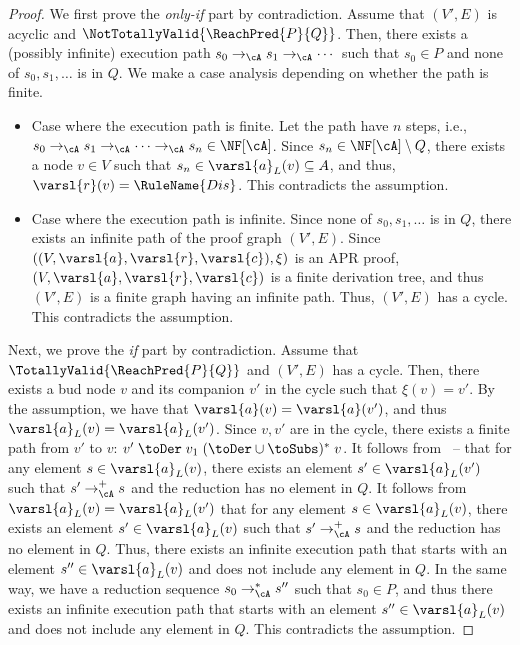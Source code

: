 \ThmTotalValidityProof*
\begin{proof}
	We first prove the \textit{only-if} part by contradiction.
	Assume that $(V',E)$ is acyclic and $\NotTotallyValid{\ReachPred{P}{Q}}$.
	Then, there exists a (possibly infinite) execution path $s_0 \to_\cA s_1 \to_\cA \cdots$ such that $s_0 \in P$ and none of $s_0,s_1,\ldots$ is in $Q$.
	We make a case analysis depending on whether the path is finite.
	\begin{itemize}
		\item Case where the execution path is finite.
		      Let the path have $n$ steps, i.e.,
		      $s_0 \to_\cA s_1 \to_\cA \cdots \to_\cA s_n \in \NF[\cA]$.
		      Since $s_n \in \NF[\cA] \setminus Q$,
		      there exists a node $v \in V$ such that
		      $s_n \in \varsl{a}_L(v) \subseteq A$, and thus, $\varsl{r}(v) = \RuleName{Dis}$.
		      This contradicts the assumption.


		\item Case where the execution path is infinite.
		      Since none of $s_0,s_1,\ldots$ is in $Q$,
		      there exists an infinite path of the proof graph $(V',E)$.
		      Since $((V,\varsl{a},\varsl{r},\varsl{c}),\xi)$ is an APR proof, $(V,\varsl{a},\varsl{r},\varsl{c})$ is a finite derivation tree, and thus $(V',E)$ is a finite graph having an infinite path.
		      Thus, $(V',E)$ has a cycle.
		      This contradicts the assumption.
	\end{itemize}

	Next, we prove the \textit{if} part by contradiction.
	Assume that
	$\TotallyValid{\ReachPred{P}{Q}}$
	and
	$(V',E)$ has a cycle.
	Then, there exists a bud node $v$ and its companion $v'$ in the cycle such that $\xi(v) = v'$.
	By the assumption, we have that $\varsl{a}(v)=\varsl{a}(v')$, and thus $\varsl{a}_L(v) = \varsl{a}_L(v')$. Since $v,v'$ are in the cycle, there exists a finite path from $v'$ to $v$:
	$v' \mathrel{\toDer} v_1 \mathrel{({\toDer} \cup {\toSubs})^*} v$.
	It follows from ~-- that
	for any element $s \in \varsl{a}_L(v)$,
	there exists an element $s' \in \varsl{a}_L(v')$
	such that $s' \to_\cA^+ s$ and the reduction has no element in $Q$.
	It follows from $\varsl{a}_L(v) = \varsl{a}_L(v')$ that
	for any element $s \in \varsl{a}_L(v)$,
	there exists an element $s' \in \varsl{a}_L(v)$
	such that $s' \to_\cA^+ s$ and the reduction has no element in $Q$.
	Thus, there exists an infinite execution path that starts with an element $s'' \in \varsl{a}_L(v)$ and does not include any element in $Q$.
	In the same way, we have a reduction sequence $s_0 \to_\cA^* s''$ such that $s_0 \in P$, and thus there exists an infinite execution path that starts with an element $s'' \in \varsl{a}_L(v)$ and does not include any element in $Q$.
	This contradicts the assumption.
\end{proof}

